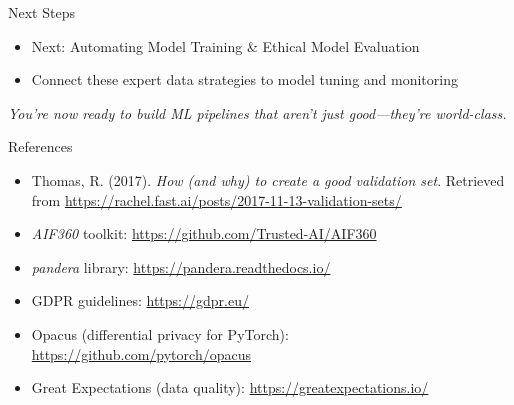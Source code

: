 \documentclass[aspectratio=169]{beamer}
\begin{document}
\begin{frame}{Next Steps}
\begin{itemize}
\item Next: Automating Model Training \& Ethical Model Evaluation
\item Connect these expert data strategies to model tuning and monitoring
\end{itemize}

\emph{You’re now ready to build ML pipelines that aren’t just good—they’re world-class.}
\end{frame}

\begin{frame}{References}
\footnotesize
\begin{itemize}
\item Thomas, R. (2017). \textit{How (and why) to create a good validation set}. Retrieved from \url{https://rachel.fast.ai/posts/2017-11-13-validation-sets/}
\item \textit{AIF360} toolkit: \url{https://github.com/Trusted-AI/AIF360}
\item \textit{pandera} library: \url{https://pandera.readthedocs.io/}
\item GDPR guidelines: \url{https://gdpr.eu/}
\item Opacus (differential privacy for PyTorch): \url{https://github.com/pytorch/opacus}
\item Great Expectations (data quality): \url{https://greatexpectations.io/}
\end{itemize}
\end{frame}
\end{document}
